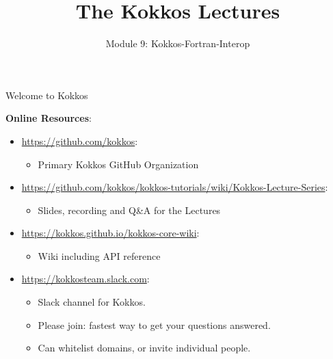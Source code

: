 


\def\sandid{SAND2020-9315 TR}

\title{The Kokkos Lectures}

\author{Module 9: Kokkos-Fortran-Interop}



\shortfalse
\mediumfalse
\fullfalse
\notoverviewtrue

\usepackage{minted}



\begin{frame}
	\titlepage
\end{frame}

\begin{frame}[fragile]{Welcome to Kokkos}

\textbf{Online Resources}:

\begin{itemize}
        \item \url{https://github.com/kokkos}:
                \begin{itemize}
                        \item Primary Kokkos GitHub Organization
                \end{itemize}
        \item \url{https://github.com/kokkos/kokkos-tutorials/wiki/Kokkos-Lecture-Series}:
                \begin{itemize}
        \item{Slides, recording and Q\&A for the Lectures}
                \end{itemize}
        \item \url{https://kokkos.github.io/kokkos-core-wiki}:
                \begin{itemize}
                        \item Wiki including API reference
                \end{itemize}
        \item \url{https://kokkosteam.slack.com}:
                \begin{itemize}
                        \item Slack channel for Kokkos.
                        \item Please join: fastest way to get your questions answered.
                        \item Can whitelist domains, or invite individual people.
                \end{itemize}
\end{itemize}

\end{frame}

